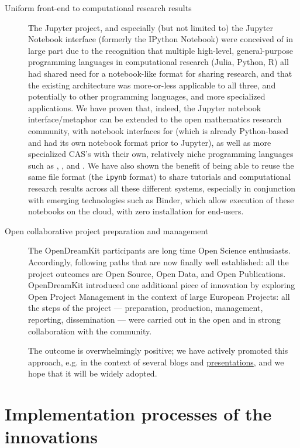 \documentclass{deliverablereport}
\begin{document}
\begin{description}
\item[Uniform front-end to computational research results] The Jupyter
    project, and especially (but not limited to) the Jupyter Notebook
    interface (formerly the IPython Notebook) were conceived of in large
    part due to the recognition that multiple high-level, general-purpose
    programming languages in computational research (Julia, Python, R) all
    had shared need for a notebook-like format for sharing research, and that
    the existing architecture was more-or-less applicable to all three, and
    potentially to other programming languages, and more specialized applications.
    We have proven that, indeed, the Jupyter notebook interface/metaphor can
    be extended to the open mathematics research community, with notebook
    interfaces for \Sage (which is already Python-based and had its own notebook
    format prior to Jupyter), as well as more specialized CAS's with their
    own, relatively niche programming languages such as \GAP, \Pari, and \Singular.
    We have also shown the benefit of being able to reuse the same file format
    (the \texttt{ipynb} format) to share tutorials and computational research
    results across all these different systems, especially in conjunction
    with emerging technologies such as Binder, which allow execution of
    these notebooks on the cloud, with zero installation for end-users.

\item[Open collaborative project preparation and management] The
  OpenDreamKit participants are long time Open Science enthusiasts.
  Accordingly, following paths that are now finally well
  established: all the project outcomes are Open Source, Open Data,
  and Open Publications. OpenDreamKit introduced one additional piece of
  innovation by exploring Open Project Management in the context of
  large European Projects: all the steps of the project ---
  preparation, production, management, reporting, dissemination ---
  were carried out in the open and in strong collaboration with the
  community.

  The outcome is overwhelmingly positive; we have actively promoted
  this approach, e.g. in the context of several blogs and
  \href{https://opendreamkit.org/2018/12/14/eu-proposal/}{presentations},
  and we hope that it will be widely adopted.
\end{description}


\section{Implementation processes of the innovations}
\end{document}
